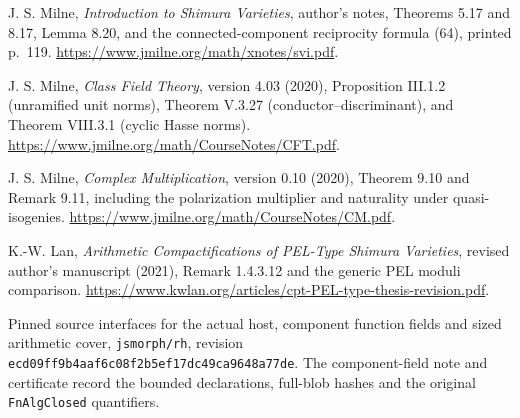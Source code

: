 J. S. Milne, \emph{Introduction to Shimura Varieties}, author's notes,
Theorems 5.17 and 8.17, Lemma 8.20, and the connected-component
reciprocity formula (64), printed p.~119.
\url{https://www.jmilne.org/math/xnotes/svi.pdf}.

J. S. Milne, \emph{Class Field Theory}, version 4.03 (2020),
Proposition III.1.2 (unramified unit norms), Theorem V.3.27
(conductor--discriminant), and Theorem VIII.3.1 (cyclic Hasse norms).
\url{https://www.jmilne.org/math/CourseNotes/CFT.pdf}.

J. S. Milne, \emph{Complex Multiplication}, version 0.10 (2020),
Theorem 9.10 and Remark 9.11, including the polarization multiplier
and naturality under quasi-isogenies.
\url{https://www.jmilne.org/math/CourseNotes/CM.pdf}.

K.-W. Lan, \emph{Arithmetic Compactifications of PEL-Type Shimura
Varieties}, revised author's manuscript (2021),
Remark 1.4.3.12 and the generic PEL moduli comparison.
\url{https://www.kwlan.org/articles/cpt-PEL-type-thesis-revision.pdf}.

Pinned source interfaces for the actual host, component function fields
and sized arithmetic cover, \texttt{jsmorph/rh}, revision
\texttt{ecd09ff9b4aaf6c08f2b5ef17dc49ca9648a77de}.
The component-field note and certificate record the bounded declarations,
full-blob hashes and the original \texttt{FnAlgClosed} quantifiers.
